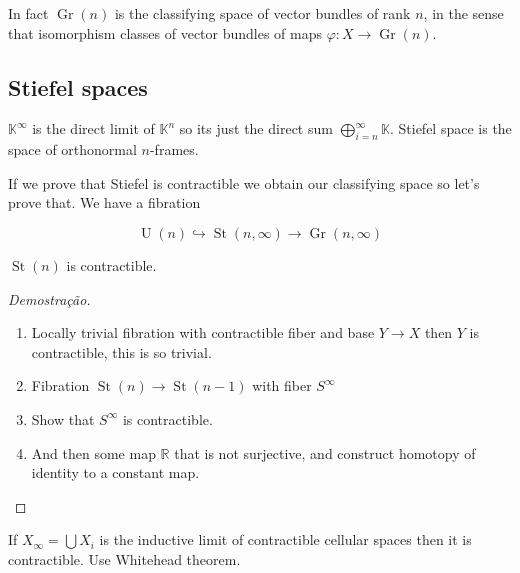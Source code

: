 \begin{remark}
	In fact $\operatorname{Gr}(n)$ is the classifying space of vector bundles of rank $n$, in the sense that isomorphism classes of vector bundles of maps $\varphi:X\to \operatorname{Gr}(n)$.
\end{remark}

\subsection{Stiefel spaces}

\begin{defn}
	$\mathbb{K}^\infty$ is the direct limit of $\mathbb{K}^n$ so its just the direct sum $\bigoplus_{i=n}^\infty\mathbb{K} $. Stiefel space is the space of orthonormal $n$-frames.
\end{defn}

If we prove that Stiefel is contractible we obtain our classifying space so let's prove that. We have a fibration

\[\operatorname{U}(n)\hookrightarrow \operatorname{St}(n,\infty)\to \operatorname{Gr}(n,\infty)\]

\begin{thm}
	$\operatorname{St}(n)$ is contractible.
\end{thm}

\begin{proof}[Demostra\c c\~ao]
	\begin{enumerate}[label=\textbf{Step \arabic*}]
		\item Locally trivial fibration with contractible fiber and base $Y\to X$ then $Y$ is contractible, this is so trivial.

		\item Fibration $ \operatorname{St}(n)\to \operatorname{St}(n-1)$ with fiber $S^\infty$ 

		\item Show that $S^\infty$ is contractible.

		\item And then some map $\mathbb{R}$ that is not surjective, and construct homotopy of identity to a constant map.
	\end{enumerate}
\end{proof}

\begin{exercise}
	If $X_{\infty}=\bigcup X_{i} $ is the inductive limit of contractible cellular spaces then it is contractible. Use Whitehead theorem.
\end{exercise}

